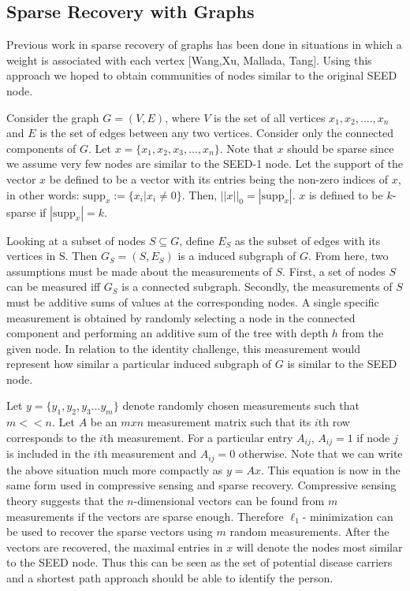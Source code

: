 \documentclass{article} %
\begin{document}

\subsection{Sparse Recovery with Graphs}
Previous work in sparse recovery of graphs has been done in situations in which a weight is associated with each vertex [Wang,Xu, Mallada, Tang]. Using this approach we hoped to obtain communities of nodes similar to the original SEED node. 

Consider the graph $G = (V,E)$, where $V$ is the set of all vertices $x_1 , x_2 , .... , x_n$  and $E$ is the set of edges between any two vertices. Consider only the connected components of $G$. Let $x = \{x_1, x_2, x_3, ... , x_n\}$. Note that $x$ should be sparse since we assume very few nodes are similar to the SEED-1 node. 
Let the support of the vector $x$ be defined to be a vector with its entries being the non-zero indices of $x$, in other words: $\textrm{supp}_x :=\{x_i | x_i \neq  0\}$. Then, $||x||_0 = |\textrm{supp}_x|$. $x$ is defined to be $k$-sparse if $ |\textrm{supp}_x| = k$.

Looking at a subset of nodes  $S \subseteq G$, define $E_S$ as the subset of edges with its vertices in S. Then $G_S = (S,E_S)$ is a induced subgraph of $G$. From here, two assumptions must be made about the measurements of $S$. First, a set of nodes $S$ can be measured iff $G_S$ is a connected subgraph. Secondly, the measurements of $S$ must be additive sums of values at the corresponding nodes. A single specific measurement is obtained by randomly selecting a node in the connected component and performing an additive sum of the tree with depth $h$ from the given node. In relation to the identity challenge, this measurement would represent how similar a particular induced subgraph of $G$ is similar to the SEED node.

Let $y = \{ y_1, y_2, y_3 ... y_m \}$ denote randomly chosen measurements such that $m << n$.  Let $A$ be an $m x n$ measurement matrix such that its $i$th row corresponds to the $i$th measurement.  For a particular entry $A_{ij}$, $A_{ij} = 1$ if  node $j$ is included in the $i$th measurement and $A_{ij} = 0$ otherwise.
Note that we can write the above situation much more compactly as $y = Ax$. This equation is now in the same form used in compressive sensing and sparse recovery.  Compressive sensing theory suggests that the $n$-dimensional vectors can be found from $m$ measurements if the vectors are sparse enough. Therefore $\ell_1$- minimization can be used to recover the sparse vectors using $m$ random measurements.  After the vectors are recovered, the maximal entries in $x$  will denote the nodes most similar to the SEED node. Thus this can be seen as the set of potential disease carriers and a shortest path approach should be able to identify the person.
\end{document}
